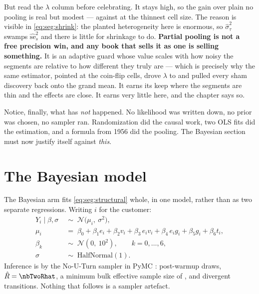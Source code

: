 

But read the $\lambda$ column before celebrating. It stays high, so the gain over plain no pooling
is real but modest --- \eur{\nbTwoSweepThinSh} against \eur{\nbTwoSweepThinNp} at the thinnest cell
size. The reason is visible in \cref{eq:seg:shrink}: the planted heterogeneity here is enormous, so
$\hat\sigma^2_\tau$ swamps $\hat{\mathrm{se}}_s^2$ and there is little for shrinkage to do.
\textbf{Partial pooling is not a free precision win, and any book that sells it as one is selling
something.} It is an adaptive guard whose value scales with how noisy the segments are relative to
how different they truly are --- which is precisely why the same estimator, pointed at the coin-flip
cells, drove $\lambda$ to \nbTwoNoiseLam{} and pulled every sham discovery back onto the grand mean. It earns its keep
where the segments are thin and the effects are close. It earns very little here, and the chapter
says so.

Notice, finally, what has \emph{not} happened. No likelihood was written down, no prior was chosen,
no sampler ran. Randomization did the causal work, two OLS fits did the estimation, and a formula
from 1956 did the pooling. The Bayesian section must now justify itself against \emph{this}.

\section{The Bayesian model}
\label{sec:seg:bayes}

The Bayesian arm fits \cref{eq:seg:structural} whole, in one model, rather than as two separate
regressions. Writing $i$ for the customer:
%
\begin{align}
  Y_i \mid \beta, \sigma &\;\sim\; \mathcal N\big(\mu_i,\ \sigma^{2}\big), \label{eq:seg:lik}\\
  \mu_i &\;=\; \beta_0 + \beta_1 e_i + \beta_2 v_i + \beta_3\, e_i v_i + \beta_4\, e_i g_i
               + \beta_5 g_i + \beta_6 t_i, \label{eq:seg:mu}\\
  \beta_k &\;\sim\; \mathcal N\!\left(0,\ 10^{2}\right), \qquad k = 0, \dots, 6,
               \label{eq:seg:prior_b}\\
  \sigma &\;\sim\; \text{HalfNormal}(1). \label{eq:seg:prior_s}
\end{align}
%
Inference is by the No-U-Turn sampler \citep{hoffman2014} in PyMC \citep{salvatier2016}:
\nbTwoNDraws{} post-warmup draws, $\hat R = \nbTwoRhat$, a minimum bulk effective sample size of
\nbTwoEss{} \citep{vehtari2021}, and \nbTwoDivergences{} divergent transitions. Nothing that follows
is a sampler artefact.

